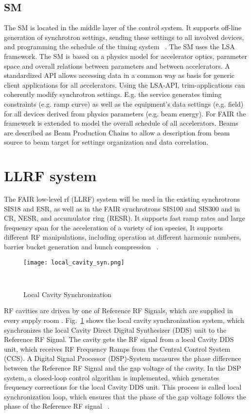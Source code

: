 \subsection{SM}
The \gls{SM} is located in the middle layer of the control system. It supports off-line generation of synchrotron settings, sending these settings to all involved devices,
and programming the schedule of the timing system ~\cite{huhmann_fair_2013}. The SM uses the LSA framework. The SM is based on a physics model for accelerator optics, parameter space and overall relations between parameters and between accelerators. A standardized API allows accessing data in a common way as basis for generic client applications for all accelerators. Using the LSA-API, trim-applications can coherently modify synchrotron settings. E.g. the service generates timing constraints (e.g. ramp curve) as well as the equipment’s data settings (e.g. field) for all devices derived from physics parameters (e.g. beam energy). For FAIR the framework is extended to model the overall schedule of all accelerators. Beams are described as Beam Production Chains to allow a description from beam source to beam target for settings organization and data correlation.

\section{LLRF system}
The FAIR low-level rf (\gls{LLRF}) system will be used in the existing synchrotrons SIS18 and \gls{ESR}, as well as in the FAIR synchrotrons SIS100 and SIS300 and in \gls{CR}, \gls{NESR}, and accumulator ring (\gls{RESR}). It supports fast ramp rates and large frequency span for the acceleration of a variety of ion species, It supports different RF manipulations, including operation at different harmonic numbers, barrier bucket generation and bunch compression ~\cite{klingbeil_new_2011}. 
\begin{figure}[H]
   \centering   
   \texttt{[image: local\_cavity\_syn.png]}
   \caption{Local Cavity Synchronization}{~\cite{klingbeil_new_2011}}
   \label{local_cavity_syn}
\end{figure}
RF cavities are driven by one of Reference RF Signals, which are supplied in every supply room . Fig.~\ref{local_cavity_syn} shows the local cavity synchronization system, which synchronizes the local Cavity Direct Digital Synthesizer (DDS) unit to the Reference RF Signal. The cavity gets the RF signal from a local Cavity \gls{DDS} unit, which receives RF Frequency Ramps from the Central Control System (\gls{CCS}). A Digital Signal Processor (\gls{DSP})-System measures the phase difference between the Reference RF Signal and the gap voltage of the cavity. In the DSP system, a closed-loop control algorithm is implemented, which generates frequency corrections for the local Cavity DDS unit. This process is called local synchronization loop, which ensures that the phase of the gap voltage follows the phase of the Reference RF signal ~\cite{klingbeil_new_2011}. 

